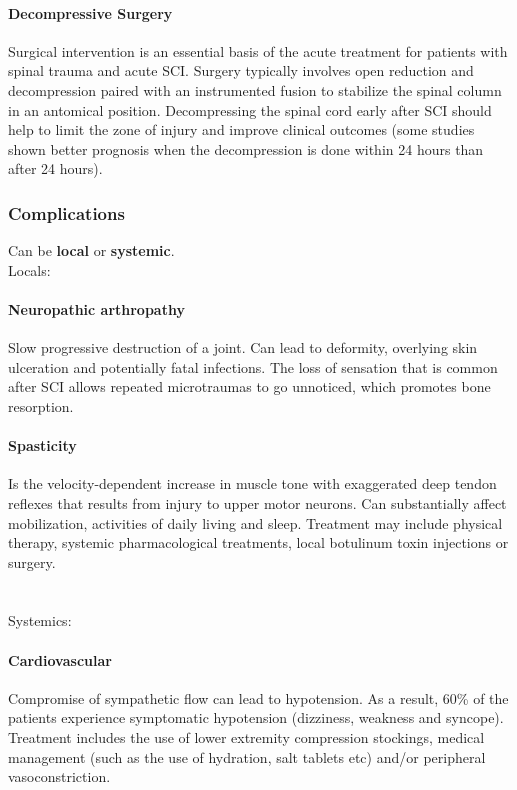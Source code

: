 \documentclass[12pt,article,oneside,a4paper]{memoir}
\begin{document}
\paragraph{Decompressive Surgery}
Surgical intervention is an essential basis of the acute treatment for patients
with spinal trauma and acute SCI. Surgery typically involves open reduction and
decompression paired with an instrumented fusion to stabilize the spinal column
in an antomical position. Decompressing the spinal cord early after SCI should
help to limit the zone of injury and improve clinical outcomes (some studies
shown better prognosis when the decompression is done within 24 hours than
after 24 hours).

\subsubsection{Complications}
Can be \textbf{local} or \textbf{systemic}. \\

Locals:\\
\paragraph{Neuropathic arthropathy}
Slow progressive destruction of a joint. Can lead to deformity, overlying skin
ulceration and potentially fatal infections. The loss of sensation that is
common after SCI allows repeated microtraumas to go unnoticed, which promotes
bone resorption.

\paragraph{Spasticity}
Is the velocity-dependent increase in muscle tone with exaggerated deep tendon
reflexes that results from injury to upper motor neurons. Can substantially
affect mobilization, activities of daily living and sleep. Treatment may
include physical therapy, systemic pharmacological treatments, local botulinum
toxin injections or surgery.
\\
\\
\\
Systemics:
\paragraph{Cardiovascular}
Compromise of sympathetic flow can lead to hypotension. As a result, 60\% of
the patients experience symptomatic hypotension (dizziness, weakness and
syncope).
Treatment includes the use of lower extremity compression stockings, medical
management (such as the use of hydration, salt tablets etc) and/or peripheral
vasoconstriction.
\end{document}
